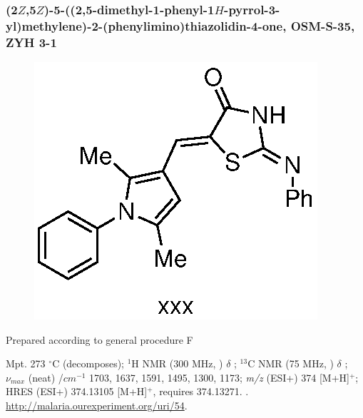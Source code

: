 \documentclass[12pt, a4paper,titlepage]{article}
\begin{document}
{\subsubsection*{(2$Z$,5$Z$)-5-((2,5-dimethyl-1-phenyl-1$H$-pyrrol-3-yl)methylene)-2-(phenylimino)thiazolidin-4-one, OSM-S-35, ZYH 3-1}
\label{exp:ZYH3}
	\begin{figure}[H]
	\begin{center}
	\includegraphics{exp/ZYH3.eps}
	\end{center}
	\vspace{-25pt}	
	\end{figure}
	
Prepared according to general procedure F


Mpt. 273 $^\circ$C (decomposes); 
$^1$H NMR (300 MHz, ) $\delta$ ; 
  $^{13}$C NMR (75 MHz, ) $\delta$ ; 
 $\nu_{max}$ (neat) /$cm^{-1}$ 1703, 1637, 1591, 1495, 1300, 1173; 
\emph{m/z} (ESI+) 374 [M+H]$^+$; HRES (ESI+) 374.13105 [M+H]$^+$,  requires 374.13271.
. 
\url{http://malaria.ourexperiment.org/uri/54}. 

}
\end{document}
